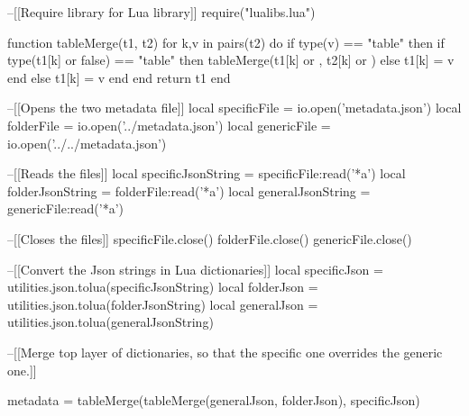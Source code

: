 \begin{luacode}
--[[Require library for Lua library]]
require("lualibs.lua")

function tableMerge(t1, t2)
    for k,v in pairs(t2) do
        if type(v) == "table" then
            if type(t1[k] or false) == "table" then
                tableMerge(t1[k] or {}, t2[k] or {})
            else
                t1[k] = v
            end
        else
            t1[k] = v
        end
    end
    return t1
end

--[[Opens the two metadata file]]
local specificFile = io.open('metadata.json')
local folderFile = io.open('../metadata.json')
local genericFile = io.open('../../metadata.json')

--[[Reads the files]]
local specificJsonString = specificFile:read('*a')
local folderJsonString = folderFile:read('*a')
local generalJsonString = genericFile:read('*a')

--[[Closes the files]]
specificFile.close()
folderFile.close()
genericFile.close()

--[[Convert the Json strings in Lua dictionaries]]
local specificJson =  utilities.json.tolua(specificJsonString)
local folderJson =  utilities.json.tolua(folderJsonString)
local generalJson =  utilities.json.tolua(generalJsonString)

--[[Merge top layer of dictionaries, so that the specific one overrides the generic one.]]

metadata = tableMerge(tableMerge(generalJson, folderJson), specificJson)

\end{luacode}